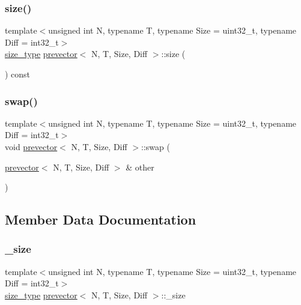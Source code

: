 \mbox{\label{classprevector_a626f7d206dbc24e5610631809762758b}} 
\subsubsection{\texorpdfstring{size()}{size()}}
{\footnotesize\ttfamily template$<$unsigned int N, typename T, typename Size = uint32\+\_\+t, typename Diff = int32\+\_\+t$>$ \\
\mbox{\hyperlink{classprevector_a7e0da95e6d1c878f6eeb572f4fc12524}{size\+\_\+type}} \mbox{\hyperlink{classprevector}{prevector}}$<$ N, T, Size, Diff $>$\+::size (\begin{DoxyParamCaption}{ }\end{DoxyParamCaption}) const\hspace{0.3cm}{\ttfamily [inline]}}

\mbox{\label{classprevector_a30e25ab1782f4a6258688334e5d1b817}} 
\subsubsection{\texorpdfstring{swap()}{swap()}}
{\footnotesize\ttfamily template$<$unsigned int N, typename T, typename Size = uint32\+\_\+t, typename Diff = int32\+\_\+t$>$ \\
void \mbox{\hyperlink{classprevector}{prevector}}$<$ N, T, Size, Diff $>$\+::swap (\begin{DoxyParamCaption}\item[{\mbox{\hyperlink{classprevector}{prevector}}$<$ N, T, Size, Diff $>$ \&}]{other }\end{DoxyParamCaption})\hspace{0.3cm}{\ttfamily [inline]}}



\subsection{Member Data Documentation}
\mbox{\label{classprevector_a39aa524551033e56732901dca003d69d}} 
\subsubsection{\texorpdfstring{\+\_\+size}{\_size}}
{\footnotesize\ttfamily template$<$unsigned int N, typename T, typename Size = uint32\+\_\+t, typename Diff = int32\+\_\+t$>$ \\
\mbox{\hyperlink{classprevector_a7e0da95e6d1c878f6eeb572f4fc12524}{size\+\_\+type}} \mbox{\hyperlink{classprevector}{prevector}}$<$ N, T, Size, Diff $>$\+::\+\_\+size\hspace{0.3cm}{\ttfamily [private]}}

